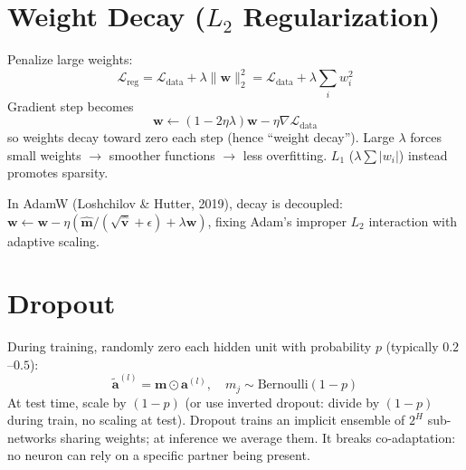 \section{Weight Decay (\texorpdfstring{$L_2$}{L2} Regularization)}
Penalize large weights:
\begin{equation}
\mathcal{L}_{\text{reg}}=\mathcal{L}_{\text{data}}+\lambda\|\mathbf{w}\|_2^2=\mathcal{L}_{\text{data}}+\lambda\sum_i w_i^2
\end{equation}
Gradient step becomes
\begin{equation}
\mathbf{w}\leftarrow(1-2\eta\lambda)\mathbf{w}-\eta\nabla\mathcal{L}_{\text{data}}
\end{equation}
so weights decay toward zero each step (hence ``weight decay''). Large $\lambda$ forces small weights $\to$ smoother functions $\to$ less overfitting. $L_1$ ($\lambda\sum|w_i|$) instead promotes sparsity.

In AdamW (Loshchilov \& Hutter, 2019), decay is decoupled: $\mathbf{w}\leftarrow\mathbf{w}-\eta(\hat{\mathbf{m}}/(\sqrt{\hat{\mathbf{v}}}+\epsilon)+\lambda\mathbf{w})$, fixing Adam's improper $L_2$ interaction with adaptive scaling.

\section{Dropout}
During training, randomly zero each hidden unit with probability $p$ (typically $0.2$--$0.5$):
\begin{equation}
\tilde{\mathbf{a}}^{(l)}=\mathbf{m}\odot\mathbf{a}^{(l)},\quad m_j\sim\text{Bernoulli}(1-p)
\end{equation}
At test time, scale by $(1-p)$ (or use inverted dropout: divide by $(1-p)$ during train, no scaling at test). Dropout trains an implicit ensemble of $2^H$ sub-networks sharing weights; at inference we average them. It breaks co-adaptation: no neuron can rely on a specific partner being present.

